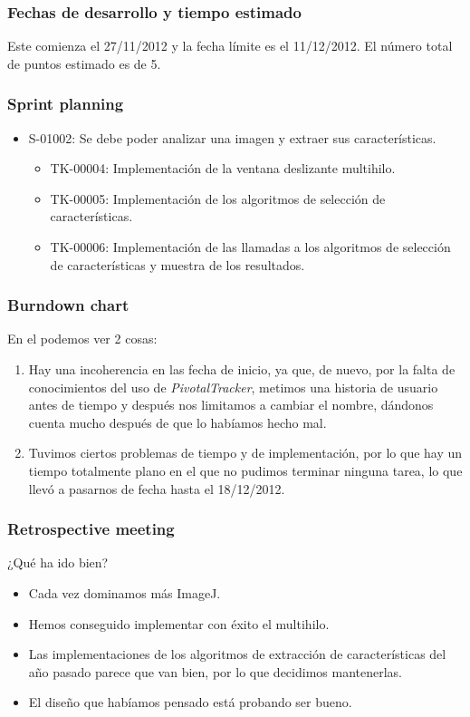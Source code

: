 \subsubsection*{Fechas de desarrollo y tiempo estimado}
Este \sprint{} comienza el 27/11/2012 y la fecha límite es el 11/12/2012. El número total de puntos estimado es de 5.

\subsubsection*{Sprint planning}
\begin{itemize}
\item S-01002: Se debe poder analizar una imagen y extraer sus características.
	\begin{itemize}
	\item TK-00004: Implementación de la ventana deslizante multihilo.
	\item TK-00005: Implementación de los algoritmos de selección de características.
	\item TK-00006: Implementación de las llamadas a los algoritmos de selección de características y muestra de los resultados.
	\end{itemize}
\end{itemize}

\subsubsection*{Burndown chart}
En el \burndownchart{}  podemos ver 2 cosas:

\begin{enumerate}
\item Hay una incoherencia en las fecha de inicio, ya que, de nuevo, por la falta de conocimientos del uso de \textit{PivotalTracker}, metimos una historia de usuario antes de tiempo y después nos limitamos a cambiar el nombre, dándonos cuenta mucho después de que lo habíamos hecho mal.
\item Tuvimos ciertos problemas de tiempo y de implementación, por lo que hay un tiempo totalmente plano en el que no pudimos terminar ninguna tarea, lo que llevó a pasarnos de fecha hasta el 18/12/2012.
\end{enumerate}


\subsubsection*{Retrospective meeting}
¿Qué ha ido bien?
\begin{itemize}
 \item Cada vez dominamos más ImageJ.
 \item Hemos conseguido implementar con éxito el multihilo.
 \item Las implementaciones de los algoritmos de extracción de características del año pasado parece que van bien, por lo que decidimos mantenerlas.
 \item El diseño que habíamos pensado está probando ser bueno.
\end{itemize}

